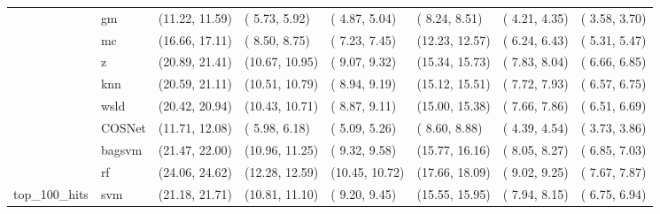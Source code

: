\begin{table}[H]
{\begin{tabular}{llllllll}
 & gm & (11.22, 11.59) & ( 5.73,  5.92) & ( 4.87,  5.04) & ( 8.24,  8.51) & ( 4.21,  4.35) & ( 3.58,  3.70)\\

 & mc & (16.66, 17.11) & ( 8.50,  8.75) & ( 7.23,  7.45) & (12.23, 12.57) & ( 6.24,  6.43) & ( 5.31,  5.47)\\

 & z & (20.89, 21.41) & (10.67, 10.95) & ( 9.07,  9.32) & (15.34, 15.73) & ( 7.83,  8.04) & ( 6.66,  6.85)\\

 & knn & (20.59, 21.11) & (10.51, 10.79) & ( 8.94,  9.19) & (15.12, 15.51) & ( 7.72,  7.93) & ( 6.57,  6.75)\\

 & wsld & (20.42, 20.94) & (10.43, 10.71) & ( 8.87,  9.11) & (15.00, 15.38) & ( 7.66,  7.86) & ( 6.51,  6.69)\\

 & COSNet & (11.71, 12.08) & ( 5.98,  6.18) & ( 5.09,  5.26) & ( 8.60,  8.88) & ( 4.39,  4.54) & ( 3.73,  3.86)\\

 & bagsvm & (21.47, 22.00) & (10.96, 11.25) & ( 9.32,  9.58) & (15.77, 16.16) & ( 8.05,  8.27) & ( 6.85,  7.03)\\

 & rf & (24.06, 24.62) & (12.28, 12.59) & (10.45, 10.72) & (17.66, 18.09) & ( 9.02,  9.25) & ( 7.67,  7.87)\\

\multirow{-15}{*}{\raggedright\arraybackslash top\_100\_hits} & svm & (21.18, 21.71) & (10.81, 11.10) & ( 9.20,  9.45) & (15.55, 15.95) & ( 7.94,  8.15) & ( 6.75,  6.94)\\
\bottomrule
\end{tabular}}
\end{table}
